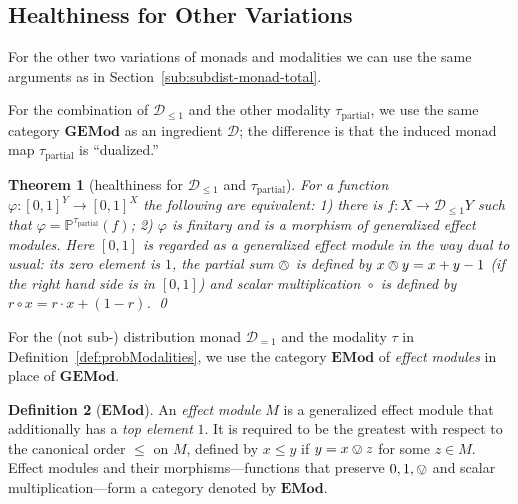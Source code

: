 \documentclass[9pt, preprint]{sigplanconf}
\theoremstyle{theorem}
\newtheorem{theorem}{Theorem}[section]
\theoremstyle{definition}
\newtheorem{definition}[theorem]{Definition}
\newtheorem{remark}[theorem]{Remark}
\newcommand{\cat}[1]{\mathcal{#1}}
\renewcommand{\phi}{\varphi}
\newcommand{\dist}{\mathcal{D}_{=1}}
\newcommand{\sdist}{\mathcal{D}_{\le 1}}
\newcommand{\uintv}{[0, 1]}
\newcommand{\Set}{\mathbf{Set}}
\newcommand{\GEMod}{\mathbf{GEMod}}
\newcommand{\DcEMod}{\mathbf{DcEMod}}
\newif\ifignore \ignorefalse
\newcommand{\auxproof}[1]{
\ifignore\mbox{}\newline
\textbf{BEGIN: AUX-PROOF} \dotfill\newline
{#1}\mbox{}\newline
\textbf{END: AUX-PROOF}\dotfill\newline
\fi}
\newcommand{\co}{\mathrel{\circ}}
\newcommand{\bbP}{\mathbb{P}}
\newcommand{\EMod}{\mathbf{EMod}}
\newcommand{\tauPartial}{\tau_{\mathrm{partial}}}
\begin{document}
\auxproof{
\begin{remark}
  The (sub)distribution monad we use is the \emph{finite-support}
  (sub)distribution monad; in \cite{Jacobs15CALCO}
  the \emph{countable-support}
  distribution monad can be represented
  using the dual adjunction
  between $\Set$ and $\DcEMod$, where the latter is the subcategory of
  $\EMod$ that additionally impose morphisms to be Scott-continuous.
\end{remark}
}

\subsection{Healthiness for Other Variations}
\label{sub:probabilistic-other}
For the other two variations of monads and modalities we can use the
same arguments as in Section~\ref{sub:subdist-monad-total}.


For the combination of $\sdist$ and the other modality $\tauPartial$,
we use the same category $\GEMod$ as an ingredient $\cat{D}$; the
difference is that the induced monad map $\tauPartial$ is ``dualized.''
\begin{theorem}[healthiness for $\sdist$ and $\tauPartial$]
  For a function
  $\varphi \colon \uintv^Y \to \uintv^X$ the following are equivalent: 1)
  there is  $f\colon X\to \sdist Y$ such that
  $\varphi = \bbP^{\tauPartial}(f)$; 2) $\phi$ is finitary and is a morphism of
  generalized effect modules. Here
  $[0, 1]$ is regarded as a generalized effect module
  in the  way dual to usual: its zero element is $1$, the partial sum $\owedge$ is defined
  by $x \owedge y = x + y - 1$ (if the right hand side is in $[0, 1]$)
  and  scalar multiplication $\co$ is defined by
  $r \co x = r \cdot x + (1 - r)$. \qed
\end{theorem}

For the (not sub-) distribution monad $\dist$ and the modality $\tau$
in Definition~\ref{def:probModalities}, we use the category $\EMod$
of \emph{effect modules} in place of $\GEMod$.
\begin{definition}[$\EMod$]\label{def:EMod}
 An \emph{effect module} $M$ is a generalized effect module that
 additionally has a \emph{top element} $1$. It is required to be the
 greatest with respect to  the canonical order $\le$ on $M$, defined by $x\le y$ if $y=x\ovee
 z$ for some $z\in M$.
 Effect modules and their morphisms---functions that preserve
 $0,1,\ovee$ and scalar multiplication---form a category denoted by
 $\EMod$.
\end{definition}
\end{document}
